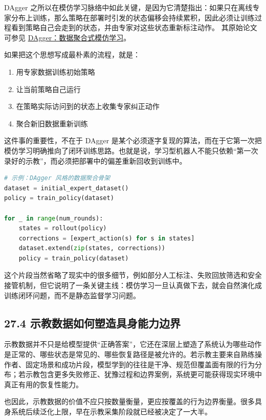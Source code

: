 DAgger 之所以在模仿学习脉络中如此关键，是因为它清楚指出：如果只在离线专家分布上训练，那么策略在部署时引发的状态偏移会持续累积，因此必须让训练过程看到策略自己会走到的状态，并由专家对这些状态重新标注动作。 其原始论文可参见 \href{https://proceedings.mlr.press/v15/ross11a.html}{DAgger：数据聚合式模仿学习}。

如果把这个思想写成最朴素的流程，就是：

\begin{enumerate}
\item 用专家数据训练初始策略
\item 让当前策略自己运行
\item 在策略实际访问到的状态上收集专家纠正动作
\item 聚合新旧数据重新训练
\end{enumerate}

这件事的重要性，不在于 DAgger 是某个必须逐字复现的算法，而在于它第一次把模仿学习明确推向了闭环训练思路。也就是说，学习型机器人不能只依赖“第一次录好的示教”，而必须把部署中的偏差重新回收到训练中。

\begin{lstlisting}[language=python]
# 示例：DAgger 风格的数据聚合骨架
dataset = initial_expert_dataset()
policy = train_policy(dataset)

for _ in range(num_rounds):
    states = rollout(policy)
    corrections = [expert_action(s) for s in states]
    dataset.extend(zip(states, corrections))
    policy = train_policy(dataset)
\end{lstlisting}

这个片段当然省略了现实中的很多细节，例如部分人工标注、失败回放筛选和安全接管机制，但它说明了一条关键主线：模仿学习一旦认真做下去，就会自然演化成训练闭环问题，而不是静态监督学习问题。

\subsection*{27.4 示教数据如何塑造具身能力边界}


示教数据并不只是给模型提供“正确答案”，它还在深层上塑造了系统认为哪些动作是正常的、哪些状态是常见的、哪些恢复路径是被允许的。若示教主要来自熟练操作者、固定场景和成功片段，模型学到的往往是干净、规范但覆盖面有限的行为分布；若示教包含更多失败修正、犹豫过程和边界案例，系统更可能获得现实环境中真正有用的恢复性能力。

也因此，示教数据的价值不应只按数量衡量，更应按覆盖的行为边界衡量。很多具身系统后续泛化上限，早在示教采集阶段就已经被决定了一大半。

